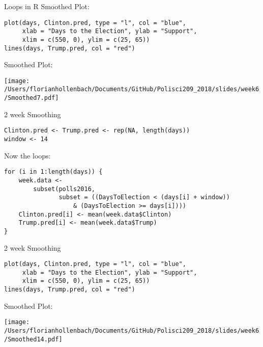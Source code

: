 \documentclass[presentation]{beamer}
\begin{document}
\begin{frame}[fragile,label={sec:orgf0dc292}]{Loops in R}
 Smoothed Plot:
\begin{verbatim}
plot(days, Clinton.pred, type = "l", col = "blue",
     xlab = "Days to the Election", ylab = "Support",
     xlim = c(550, 0), ylim = c(25, 65))
lines(days, Trump.pred, col = "red")
\end{verbatim}
\end{frame}


\begin{frame}[label={sec:org75b6a2e}]{Smoothed Plot:}
\begin{center}
\texttt{[image: /Users/florianhollenbach/Documents/GitHub/Polisci209\_2018/slides/week6/Smoothed7.pdf]}
\end{center}
\end{frame}



\begin{frame}[fragile,shrink=25,label={sec:org0cdcf77}]{2 week Smoothing}
 \begin{verbatim}
Clinton.pred <- Trump.pred <- rep(NA, length(days))
window <- 14

\end{verbatim}
\pause


Now the loops:
\begin{verbatim}
for (i in 1:length(days)) {
    week.data <-
        subset(polls2016,
               subset = ((DaysToElection < (days[i] + window))
                   & (DaysToElection >= days[i])))
    Clinton.pred[i] <- mean(week.data$Clinton)
    Trump.pred[i] <- mean(week.data$Trump)
}
\end{verbatim}
\end{frame}

\begin{frame}[fragile,label={sec:orgaa0d181}]{2 week Smoothing}
 \begin{verbatim}
plot(days, Clinton.pred, type = "l", col = "blue",
     xlab = "Days to the Election", ylab = "Support",
     xlim = c(550, 0), ylim = c(25, 65))
lines(days, Trump.pred, col = "red")
\end{verbatim}
\end{frame}


\begin{frame}[label={sec:org86a4801}]{Smoothed Plot:}
\begin{center}
\texttt{[image: /Users/florianhollenbach/Documents/GitHub/Polisci209\_2018/slides/week6/Smoothed14.pdf]}
\end{center}
\end{frame}
\end{document}
